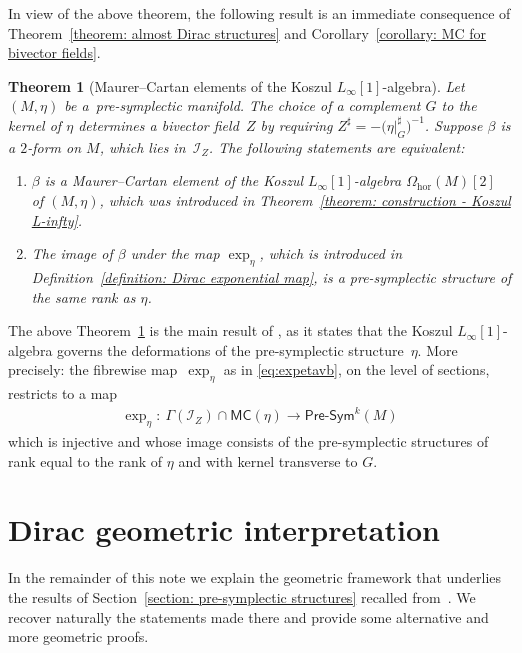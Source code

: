 \documentclass[10pt,a4paper]{amsart}
\numberwithin{equation}{section}
\newtheorem{Theorem}{Theorem}[section]
\newcommand{\Presym}{\mathsf{Pre}\textrm{-}\mathsf{Sym}}
\newcommand{\hor}{\mathrm{hor}}
\newcommand{\MC}{\mathsf{MC}}
\newcommand{\lione}{$L_{\infty}[1]$-algebra }
\begin{document}
In view of the above theorem, the following result \cite[Theorem~3.19]{SZPre} is an immediate consequence of Theorem~\ref{theorem: almost Dirac structures} and Corollary~\ref{corollary: MC for bivector fields}.

\begin{Theorem}[Maurer--Cartan elements of the Koszul {$L_\infty[1]$}-algebra] \label{theorem: main result} Let $(M,\eta)$ be a~pre-symplectic manifold. The choice of a complement $G$ to the kernel of $\eta$ determines a bivector field~$Z$ by requiring $Z^\sharp=-\big({\eta \vert_G^\sharp}\big)^{-1}$. Suppose $\beta$ is a $2$-form on $M$, which lies in~$\mathcal{I}_Z$. The following statements are equivalent:
\begin{enumerate}\itemsep=0pt
\item[$1.$] $\beta$ is a Maurer--Cartan element of the Koszul \lione $\Omega_\hor(M)[2]$ of $(M,\eta)$, which was introduced in Theorem~{\rm \ref{theorem: construction - Koszul L-infty}}.
\item[$2.$] The image of $\beta$ under the map $\exp_\eta$, which is introduced in Definition~{\rm \ref{definition: Dirac exponential map}}, is a pre-symplectic structure of the same rank as $\eta$.
\end{enumerate}
\end{Theorem}

The above Theorem~\ref{theorem: main result} is the main result of \cite{SZPre}, as it states that the Koszul $L_{\infty}[1]$-algebra governs the deformations of the pre-symplectic structure~$\eta$. More precisely: the fibrewise map~$\exp_\eta$ as in \eqref{eq:expetavb}, on the level of sections, restricts to a map
\begin{gather*}
\boxed{ \exp_\eta\colon \ \Gamma(\mathcal{I}_Z)\cap \MC(\eta) \to \Presym^k(M)}
\end{gather*}
which is injective and whose image consists of the pre-symplectic structures of rank equal to the rank of $\eta$ and with kernel transverse to $G$.

\section{Dirac geometric interpretation}\label{section: Dirac}

In the remainder of this note we explain the geometric framework that underlies the results of Section~\ref{section: pre-symplectic structures} recalled from~\cite{SZPre}. We recover naturally the statements made there and provide some alternative and more geometric proofs.
\end{document}
